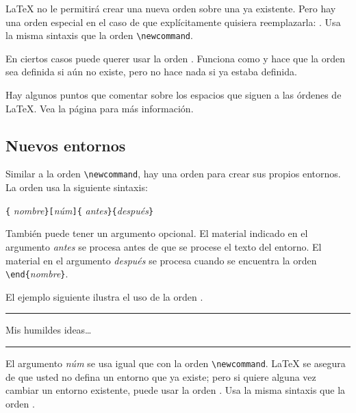 \LaTeX{} no le permitirá crear una nueva orden sobre una ya existente.  Pero hay una orden especial en el caso de que explícitamente quisiera reemplazarla: . Usa la misma sintaxis que la orden \verb|\newcommand|.

En ciertos casos puede querer usar la orden .  Funciona como  y hace que la orden sea definida si aún no existe, pero no hace nada si ya estaba definida.

Hay algunos puntos que comentar sobre los espacios que siguen a las órdenes de \LaTeX{}.  Vea la página  \pageref{whitespace} para más información.

\subsection{Nuevos entornos}

Similar a la orden \verb|\newcommand|, hay una orden para crear sus propios entornos.  La orden  usa la siguiente sintaxis:

\begin{lscommand}
\verb|{|%
       \emph{nombre}\verb|}[|\emph{núm}\verb|]{|%
       \emph{antes}\verb|}{|\emph{después}\verb|}|
\end{lscommand}

También  puede tener un argumento opcional.  El material indicado en el argumento \emph{antes} se procesa antes de que se procese el texto del entorno.  El material en el argumento \emph{después} se procesa cuando se encuentra la orden \verb|\end{|\emph{nombre}\verb|}|.

El ejemplo siguiente ilustra el uso de la orden .
\begin{example}
\newenvironment{king}
 {\rule{1ex}{1ex}%
      \hspace{\stretch{1}}}
 {%
      \rule{1ex}{1ex}}

\begin{king} 
Mis humildes ideas\ldots
\end{king}
\end{example}

El argumento \emph{núm} se usa igual que con la orden \verb|\newcommand|. \LaTeX{} se asegura de que usted no defina un entorno que ya existe; pero si quiere alguna vez cambiar un entorno existente, puede usar la orden .  Usa la misma sintaxis que la orden .


